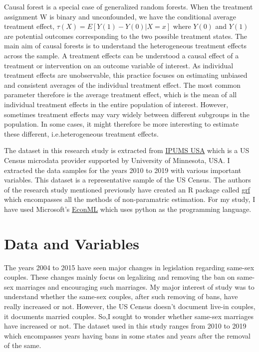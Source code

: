 \documentclass[11pt, a4paper, leqno]{article}
\begin{document}
Causal forest is a special case of generalized random forests.
When the treatment assignment W is binary and unconfounded, we have the conditional average treatment effect, $\tau(X) = E[Y(1) - Y(0) | X = x]$ where $Y(0)$ and $Y(1)$ are potential outcomes
corresponding to the two possible treatment states.
The main aim of causal forests is to understand the heterogeneous treatment effects across the sample.
A treatment effects can be understood a causal effect of a treatment or intervention on an outcome variable of interest.
 As individual treatment effects are unobservable, this practice focuses on estimating unbiased and consistent averages of the individual treatment effect.
 The most common parameter therefore is the average treatment effect, which is the mean of all individual treatment effects in the entire population of
interest.
However, sometimes treatment effects may vary widely between different subgroups in the population.
In some cases, it might therefore be more interesting to estimate these different, i.e.heterogeneous treatment effects.

 The dataset in this research study is extracted from \href{https://usa.ipums.org/usa/index.shtml}{IPUMS USA} which is a US Census microdata
 provider supported by University of Minnesota, USA. I extracted the data samples for the years 2010 to 2019 with various important variables.
 This dataset is a representative sample of the US Census.
 The authors of the research study mentioned previously have created an R package
 called \href{https://github.com/grf-labs/grf}{grf} which encompasses all the methods of non-paramatric estimation.
 For my study, I have used Microsoft's \href{https://github.com/py-why/EconML}{EconML} which uses python as the programming language.



 \section{Data and Variables} %
\label{sec:Data and Variables}

The years 2004 to 2015 have seen major changes in legislation regarding same-sex couples.
These changes mainly focus on legalizing and removing the ban on same-sex marriages and encouraging such marriages.
My major interest of study was to understand whether the same-sex couples, after such removing of bans, have really increased or not.
However, the US Census doesn't document live-in couples, it documents married couples.
So,I sought to wonder whether same-sex marriages have increased or not.
The dataset used in this study ranges from 2010 to 2019 which encompasses years having bans in some states and years after the removal of the same.
\end{document}
